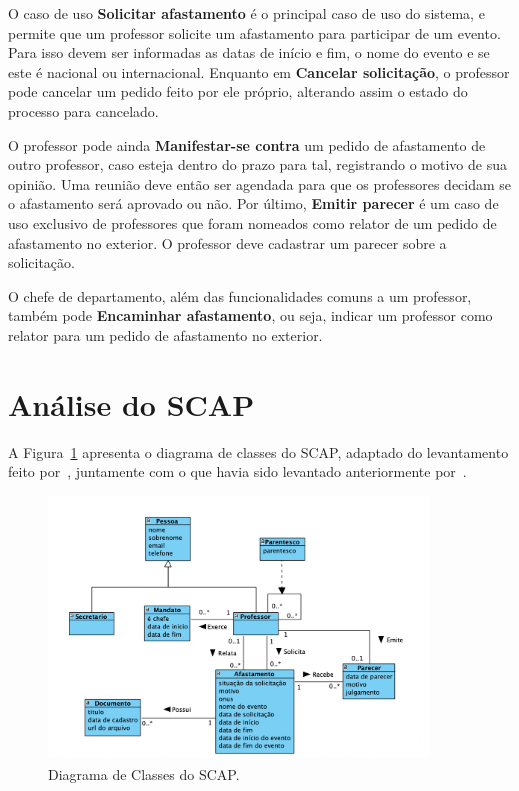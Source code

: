 O caso de uso \textbf{Solicitar afastamento} é o principal caso de uso do sistema, e permite
que um professor solicite um afastamento para participar de um evento. Para isso devem ser informadas
as datas de início e fim, o nome do evento e se este é nacional ou internacional. 
Enquanto em \textbf{Cancelar solicitação}, o professor pode cancelar um pedido feito por ele próprio,
alterando assim o estado do processo para cancelado.

O professor pode ainda \textbf{Manifestar-se contra} um pedido de afastamento de 
outro professor, caso esteja dentro do prazo para tal, registrando o motivo de sua opinião.
Uma reunião deve então ser agendada para que os professores decidam se o afastamento será aprovado ou não.
Por último, \textbf{Emitir parecer} é um caso de uso exclusivo de professores que foram nomeados
como relator de um pedido de afastamento no exterior. O professor deve cadastrar um parecer sobre a solicitação.

O chefe de departamento, além das funcionalidades comuns a um professor, também pode \textbf{Encaminhar afastamento},
ou seja, indicar um professor como relator para um pedido de afastamento no exterior. 


\section{Análise do SCAP}
\label{sec-espec-analise-scap}

A Figura~\ref{fig:diagrama-classes} apresenta o diagrama de classes do SCAP, adaptado
do levantamento feito por~, juntamente com o que havia sido
levantado anteriormente por~.

\begin{figure}
    \centering  
    \includegraphics[width=0.9\textwidth]{figuras/fig-diagrama-classes.png}
    \caption{Diagrama de Classes do SCAP.}
    \label{fig:diagrama-classes}
\end{figure}

